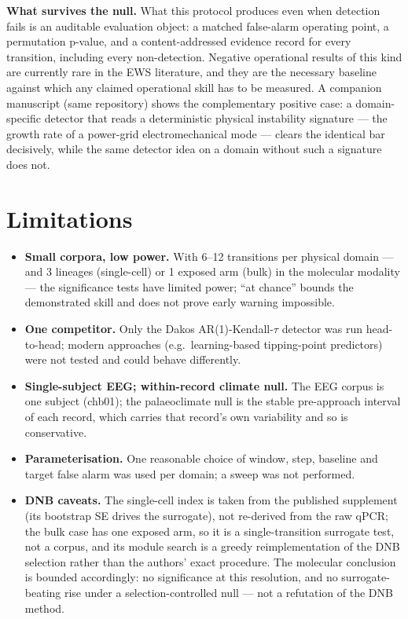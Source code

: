 \documentclass[aip,cha,preprint,amsmath,amssymb]{revtex4-2}
\begin{document}
\textbf{What survives the null.} What this protocol produces even when
detection fails is an auditable evaluation object: a matched
false-alarm operating point, a permutation p-value, and a
content-addressed evidence record for every transition, including every
non-detection. Negative operational results of this kind are currently
rare in the EWS literature, and they are the necessary baseline against
which any claimed operational skill has to be measured. A companion
manuscript (same repository) shows the complementary positive case: a
domain-specific detector that reads a deterministic physical
instability signature --- the growth rate of a power-grid
electromechanical mode --- clears the identical bar decisively, while
the same detector idea on a domain without such a signature does not.

\section{Limitations}\label{sec:limitations}

\begin{itemize}
  \item \textbf{Small corpora, low power.} With 6--12 transitions per
    physical domain --- and 3 lineages (single-cell) or 1 exposed arm
    (bulk) in the molecular modality --- the significance tests have
    limited power; ``at chance'' bounds the demonstrated skill and does
    not prove early warning impossible.
  \item \textbf{One competitor.} Only the Dakos AR(1)-Kendall-$\tau$
    detector was run head-to-head; modern approaches (e.g.\
    learning-based tipping-point predictors) were not tested and could
    behave differently.
  \item \textbf{Single-subject EEG; within-record climate null.} The
    EEG corpus is one subject (chb01); the palaeoclimate null is the
    stable pre-approach interval of each record, which carries that
    record's own variability and so is conservative.
  \item \textbf{Parameterisation.} One reasonable choice of window,
    step, baseline and target false alarm was used per domain; a sweep
    was not performed.
  \item \textbf{DNB caveats.} The single-cell index is taken from the
    published supplement (its bootstrap SE drives the surrogate), not
    re-derived from the raw qPCR; the bulk case has one exposed arm, so
    it is a single-transition surrogate test, not a corpus, and its
    module search is a greedy reimplementation of the DNB selection
    rather than the authors' exact procedure. The molecular conclusion
    is bounded accordingly: no significance at this resolution, and no
    surrogate-beating rise under a selection-controlled null --- not a
    refutation of the DNB method.
\end{itemize}
\end{document}
